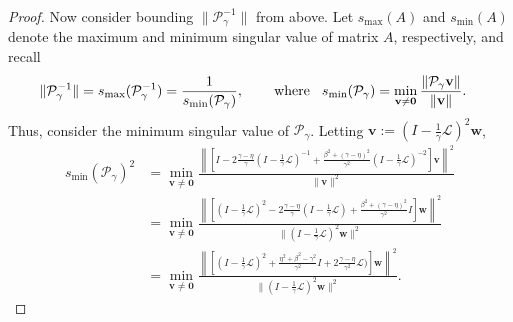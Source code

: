 \documentclass[a4paper,10pt]{article}
\begin{document}
\begin{proof}
Now consider bounding $\|\mathcal{P}_\gamma^{-1}\|$ from above. Let $s_{\max}(A)$
and $s_{\min}(A)$ denote the maximum and minimum singular value of matrix $A$,
respectively, and recall
%
\begin{align*}
\|\mathcal{P}_\gamma^{-1}\| = s_{\max}(\mathcal{P}_\gamma^{-1})
	& = \frac{1}{s_{\min}(\mathcal{P}_\gamma)}, \hspace{5ex}\textnormal{where}\hspace{2ex}
s_{\min}(\mathcal{P}_\gamma) =
	\min_{\mathbf{v}\neq\mathbf{0}} \frac{\|\mathcal{P}_\gamma\mathbf{v}\|}{\|\mathbf{v}\|}.
\end{align*}
%
Thus, consider the minimum singular value of $\mathcal{P}_\gamma$. Letting $\mathbf{v} :=
(I - \tfrac{1}{\gamma}\mathcal{L})^{2}\mathbf{w}$,
%
\begin{align}\nonumber
s_{\min}(\mathcal{P}_\gamma)^2 & = \min_{\mathbf{v}\neq\mathbf{0}}
	\frac{\left\| \left[I - 2\frac{\gamma-\eta}{\gamma}(I - \tfrac{1}{\gamma}
		\mathcal{L})^{-1} + \frac{\beta^2 + (\gamma-\eta)^2}{\gamma^2}
		(I - \tfrac{1}{\gamma}\mathcal{L})^{-2}\right]\mathbf{v} \right\|^2}
	{\|\mathbf{v}\|^2} \\
& = \min_{\mathbf{v}\neq\mathbf{0}}
	\frac{\left\| \left[(I - \tfrac{1}{\gamma}\mathcal{L})^{2} - 2\frac{\gamma-\eta}{\gamma}
		(I - \tfrac{1}{\gamma} \mathcal{L}) + \frac{\beta^2 + (\gamma-\eta)^2}{\gamma^2} I
		\right]\mathbf{w} \right\|^2}
	{\|(I - \tfrac{1}{\gamma}\mathcal{L})^{2}\mathbf{w}\|^2} \nonumber\\
& = \min_{\mathbf{v}\neq\mathbf{0}}
	\frac{\left\| \left[(I - \tfrac{1}{\gamma}\mathcal{L})^{2} + 
		\tfrac{\eta^2+\beta^2-\gamma^2}{\gamma^2} I + 2\frac{\gamma-\eta}{\gamma^2}
		\mathcal{L}) \right]\mathbf{w} \right\|^2}
	{\|(I - \tfrac{1}{\gamma}\mathcal{L})^{2}\mathbf{w}\|^2}.\label{eq:smin0}
\end{align}
%


\end{proof}
\end{document}
